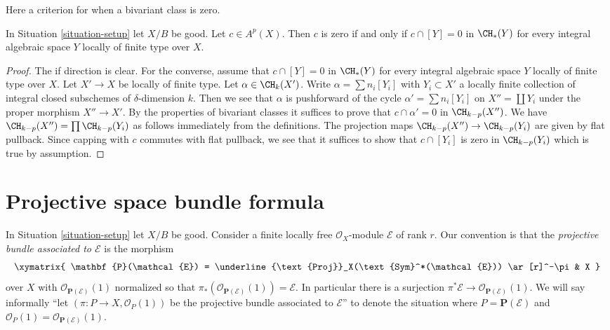 \noindent
Here a criterion for when a bivariant class is zero.

\begin{lemma}
\label{lemma-bivariant-zero}
In Situation \ref{situation-setup} let $X/B$ be good. Let $c \in A^p(X)$.
Then $c$ is zero if and only if $c \cap [Y] = 0$ in $\CH_*(Y)$
for every integral algebraic space $Y$ locally of finite type over $X$.
\end{lemma}

\begin{proof}
The if direction is clear. For the converse, assume that $c \cap [Y] = 0$ in
$\CH_*(Y)$ for every integral algebraic space $Y$ locally of finite type
over $X$.
Let $X' \to X$ be locally of finite type. Let $\alpha \in \CH_k(X')$.
Write $\alpha = \sum n_i [Y_i]$ with $Y_i \subset X'$ a locally finite
collection of integral closed subschemes of $\delta$-dimension $k$.
Then we see that $\alpha$ is pushforward of the cycle
$\alpha' = \sum n_i[Y_i]$ on $X'' = \coprod Y_i$ under the
proper morphism $X'' \to X'$. By the properties of bivariant
classes it suffices to prove that $c \cap \alpha' = 0$ in $\CH_{k - p}(X'')$.
We have $\CH_{k - p}(X'') = \prod \CH_{k - p}(Y_i)$ as follows immediately
from the definitions. The projection maps
$\CH_{k - p}(X'') \to \CH_{k - p}(Y_i)$
are given by flat pullback. Since capping with $c$ commutes with
flat pullback, we see that it suffices to show that $c \cap [Y_i]$
is zero in $\CH_{k - p}(Y_i)$ which is true by assumption.
\end{proof}















\section{Projective space bundle formula}
\label{section-projective-space-bundle-formula}

\noindent
In Situation \ref{situation-setup} let $X/B$ be good.
Consider a finite locally free $\mathcal{O}_X$-module
$\mathcal{E}$ of rank $r$.
Our convention is that the {\it projective bundle associated to
$\mathcal{E}$} is the morphism
$$
\xymatrix{
\mathbf{P}(\mathcal{E}) =
\underline{\text{Proj}}_X(\text{Sym}^*(\mathcal{E}))
\ar[r]^-\pi
& X
}
$$
over $X$ with
$\mathcal{O}_{\mathbf{P}(\mathcal{E})}(1)$ normalized so that
$\pi_*(\mathcal{O}_{\mathbf{P}(\mathcal{E})}(1)) = \mathcal{E}$.
In particular there is a surjection
$\pi^*\mathcal{E} \to \mathcal{O}_{\mathbf{P}(\mathcal{E})}(1)$.
We will say informally ``let $(\pi : P \to X, \mathcal{O}_P(1))$
be the projective bundle associated to $\mathcal{E}$'' to denote
the situation where $P = \mathbf{P}(\mathcal{E})$ and
$\mathcal{O}_P(1) = \mathcal{O}_{\mathbf{P}(\mathcal{E})}(1)$.

